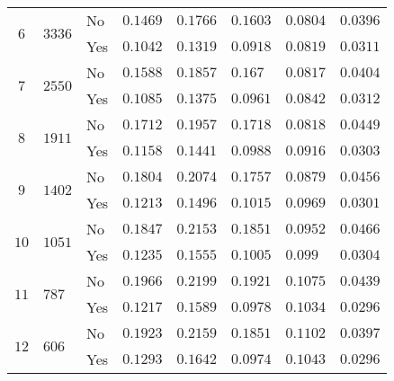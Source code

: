 \begin{table}[b]
\begin{adjustwidth}{-2cm}{}
\begin{tabular}{ c C{1.5cm} C{2.1cm} C{2.1cm} C{2.1cm} C{2.1cm} C{2.1cm} C{2.1cm} }
       &  & No  & $0.1469$ & $0.1766$ & $0.1603$ & $0.0804$ & $0.0396$  \\
                                                    && Yes & $0.1042$ & $0.1319$ & $0.0918$ & $0.0819$ & $0.0311$  \\ \midrule
       &  & No  & $0.1588$ & $0.1857$ & $0.167$  & $0.0817$ & $0.0404$  \\
                                                    && Yes & $0.1085$ & $0.1375$ & $0.0961$ & $0.0842$ & $0.0312$  \\ \midrule
       &  & No  & $0.1712$ & $0.1957$ & $0.1718$ & $0.0818$ & $0.0449$  \\
                                                    && Yes & $0.1158$ & $0.1441$ & $0.0988$ & $0.0916$ & $0.0303$  \\ \midrule
       &  & No  & $0.1804$ & $0.2074$ & $0.1757$ & $0.0879$ & $0.0456$  \\
                                                    && Yes & $0.1213$ & $0.1496$ & $0.1015$ & $0.0969$ & $0.0301$  \\ \midrule
       &  & No & $0.1847$ & $0.2153$ & $0.1851$ & $0.0952$ & $0.0466$  \\
                                                    && Yes & $0.1235$ & $0.1555$ & $0.1005$ & $0.099$  & $0.0304$  \\ \midrule
       &  & No  & $0.1966$ & $0.2199$ & $0.1921$ & $0.1075$ & $0.0439$  \\
                                                    && Yes & $0.1217$ & $0.1589$ & $0.0978$ & $0.1034$ & $0.0296$  \\ \midrule
       &  & No  & $0.1923$ & $0.2159$ & $0.1851$ & $0.1102$ & $0.0397$  \\
                                                    && Yes & $0.1293$ & $0.1642$ & $0.0974$ & $0.1043$ & $0.0296$  \\ \midrule



\end{tabular}
\end{adjustwidth}
\end{table}
